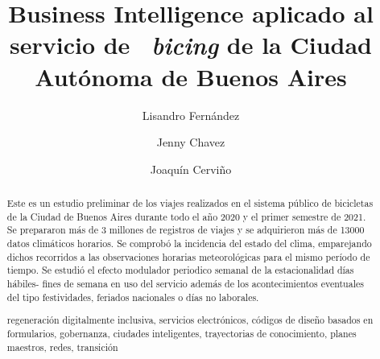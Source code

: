 \documentclass[runningheads,a4paper,spanish]{llncs}
\newcommand{\keywords}[1]{\par\addvspace\baselineskip
\noindent\keywordname\enspace\ignorespaces#1}
\begin{document}
\mainmatter  %

\title{Business Intelligence aplicado al servicio de ~\textit{bicing} de la Ciudad Autónoma de Buenos Aires}


%
%
\author{Lisandro Fernández \and Jenny Chavez \and Joaquín Cerviño}
%


\tocauthor{}
\maketitle

\begin{abstract}

Este es un estudio preliminar de los viajes realizados en el sistema público de
bicicletas de la Ciudad de Buenos Aires durante todo el año 2020 y el primer
semestre de 2021.
Se prepararon más de 3 millones de registros de viajes y se adquirieron más de
13000 datos climáticos horarios. Se comprobó la incidencia
del estado del clima, emparejando dichos recorridos a las observaciones
horarias meteorológicas para el mismo período de tiempo.
Se estudió el efecto modulador periodico semanal de la estacionalidad días
hábiles- fines de semana en uso del servicio además de los acontecimientos
eventuales del tipo festividades, feriados nacionales o días
no laborales.

\keywords{
regeneración digitalmente inclusiva, servicios electrónicos,
códigos de diseño basados en formularios, gobernanza, ciudades inteligentes,
trayectorias de conocimiento, planes maestros, redes, 
transición
}
\end{abstract}
\end{document}
